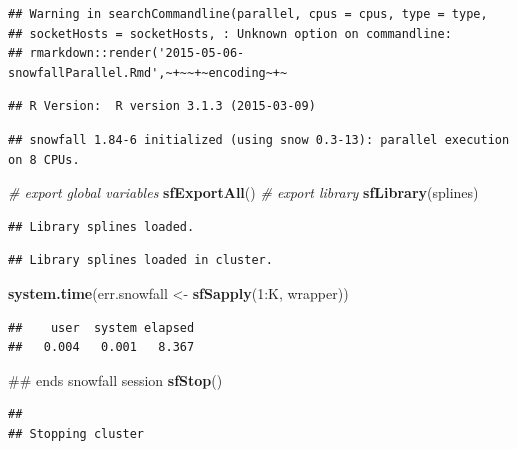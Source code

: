 \documentclass[]{article}
\newenvironment{Shaded}{\begin{snugshade}}{\end{snugshade}}
\newcommand{\KeywordTok}[1]{\textcolor[rgb]{0.13,0.29,0.53}{\textbf{{#1}}}}
\newcommand{\DecValTok}[1]{\textcolor[rgb]{0.00,0.00,0.81}{{#1}}}
\newcommand{\StringTok}[1]{\textcolor[rgb]{0.31,0.60,0.02}{{#1}}}
\newcommand{\CommentTok}[1]{\textcolor[rgb]{0.56,0.35,0.01}{\textit{{#1}}}}
\newcommand{\NormalTok}[1]{{#1}}
\begin{document}
\begin{verbatim}
## Warning in searchCommandline(parallel, cpus = cpus, type = type,
## socketHosts = socketHosts, : Unknown option on commandline:
## rmarkdown::render('2015-05-06-snowfallParallel.Rmd',~+~~+~encoding~+~
\end{verbatim}

\begin{verbatim}
## R Version:  R version 3.1.3 (2015-03-09)
\end{verbatim}

\begin{verbatim}
## snowfall 1.84-6 initialized (using snow 0.3-13): parallel execution on 8 CPUs.
\end{verbatim}

\begin{Shaded}
\begin{Highlighting}[]
\CommentTok{# export global variables}
\KeywordTok{sfExportAll}\NormalTok{()}
\CommentTok{# export library}
\KeywordTok{sfLibrary}\NormalTok{(splines)}
\end{Highlighting}
\end{Shaded}

\begin{verbatim}
## Library splines loaded.
\end{verbatim}

\begin{verbatim}
## Library splines loaded in cluster.
\end{verbatim}

\begin{Shaded}
\begin{Highlighting}[]
\KeywordTok{system.time}\NormalTok{(err.snowfall <-}\StringTok{ }\KeywordTok{sfSapply}\NormalTok{(}\DecValTok{1}\NormalTok{:K, wrapper))}
\end{Highlighting}
\end{Shaded}

\begin{verbatim}
##    user  system elapsed 
##   0.004   0.001   8.367
\end{verbatim}

\begin{Shaded}
\begin{Highlighting}[]
\NormalTok{## ends snowfall session}
\KeywordTok{sfStop}\NormalTok{()}
\end{Highlighting}
\end{Shaded}

\begin{verbatim}
## 
## Stopping cluster
\end{verbatim}
\end{document}
